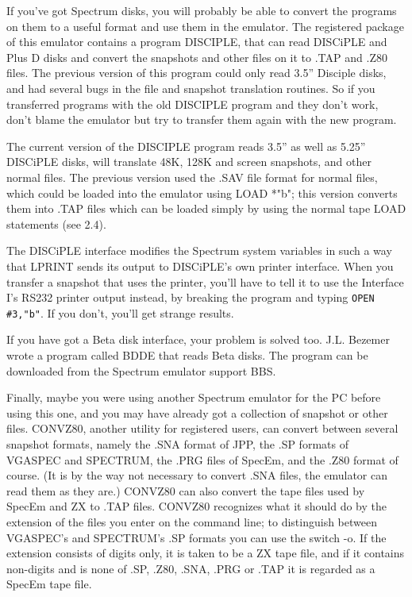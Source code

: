     If you've got Spectrum disks, you will probably be able to convert the
    programs on them to a useful format and use them in the emulator.  The
    registered package of this emulator contains a program DISCIPLE, that
    can read DISCiPLE and Plus D disks and convert the snapshots and other
    files on it to .TAP and .Z80 files.  The previous version of this
    program could only read 3.5'' Disciple disks, and had several bugs in
    the file and snapshot translation routines.  So if you transferred
    programs with the old DISCIPLE program and they don't work, don't blame
    the emulator but try to transfer them again with the new program.

    The current version of the DISCIPLE program reads 3.5'' as well as
    5.25'' DISCiPLE disks, will translate 48K, 128K and screen snapshots,
    and other normal files.  The previous version used the .SAV file format
    for normal files, which could be loaded into the emulator using LOAD
    *"b"; this version converts them into .TAP files which can be loaded
    simply by using the normal tape LOAD statements (see 2.4).

    The DISCiPLE interface modifies the Spectrum system variables in such a
    way that LPRINT sends its output to DISCiPLE's own printer interface.
    When you transfer a snapshot that uses the printer, you'll have to tell
    it to use the Interface I's RS232 printer output instead, by breaking
    the program and typing \verb|OPEN #3,"b"|.  If you don't, you'll get strange
    results.

    If you have got a Beta disk interface, your problem is solved too. J.L.
    Bezemer wrote a program called BDDE that reads Beta disks.  The program
    can be downloaded from the Spectrum emulator support BBS.

    Finally, maybe you were using another Spectrum emulator for the PC
    before using this one, and you may have already got a collection of
    snapshot or other files.  CONVZ80, another utility for registered users,
    can convert between several snapshot formats, namely the .SNA format of
    JPP, the .SP formats of VGASPEC and SPECTRUM, the .PRG files of SpecEm,
    and the .Z80 format of course.  (It is by the way not necessary to
    convert .SNA files, the emulator can read them as they are.)  CONVZ80
    can also convert the tape files used by SpecEm and ZX to .TAP files.
    CONVZ80 recognizes what it should do by the extension of the files you
    enter on the command line; to distinguish between VGASPEC's and
    SPECTRUM's .SP formats you can use the switch -o.  If the extension
    consists of digits only, it is taken to be a ZX tape file, and if it
    contains non-digits and is none of .SP, .Z80, .SNA, .PRG or .TAP it is
    regarded as a SpecEm tape file.

